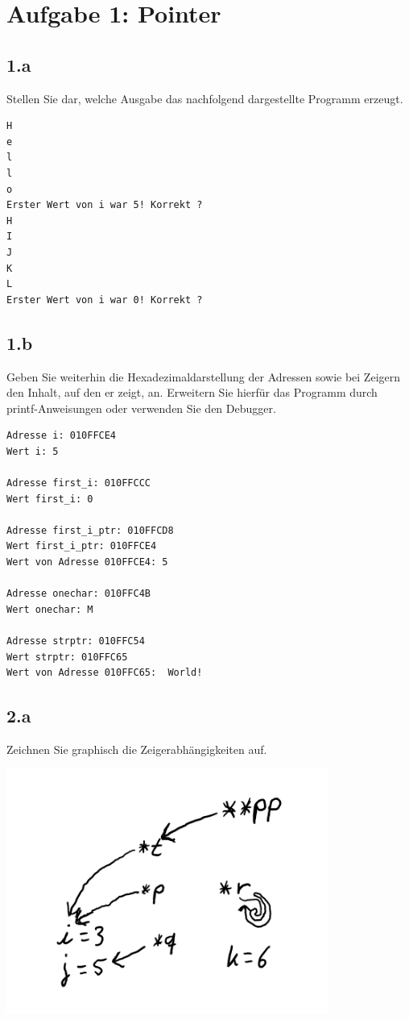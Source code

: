 \chapter*{Aufgabe 1: Pointer}


\section*{1.a}
Stellen Sie dar, welche Ausgabe das nachfolgend dargestellte Programm erzeugt.\\
\begin{lstlisting}
H
e
l
l
o
Erster Wert von i war 5! Korrekt ?
H
I
J
K
L
Erster Wert von i war 0! Korrekt ?
\end{lstlisting}

\section*{1.b}
Geben Sie weiterhin die Hexadezimaldarstellung der Adressen sowie bei
Zeigern den Inhalt, auf den er zeigt, an. Erweitern Sie hierfür das Programm durch
printf-Anweisungen oder verwenden Sie den Debugger.	\\

\begin{lstlisting}
Adresse i: 010FFCE4
Wert i: 5

Adresse first_i: 010FFCCC
Wert first_i: 0

Adresse first_i_ptr: 010FFCD8
Wert first_i_ptr: 010FFCE4
Wert von Adresse 010FFCE4: 5

Adresse onechar: 010FFC4B
Wert onechar: M

Adresse strptr: 010FFC54
Wert strptr: 010FFC65
Wert von Adresse 010FFC65:  World!
\end{lstlisting}
\newpage
\thispagestyle{fancy}
\section*{2.a}
Zeichnen Sie graphisch die Zeigerabhängigkeiten auf.\\
\begin{center}
	\includegraphics[width=300pt]{img/pointer.png}
\end{center}
